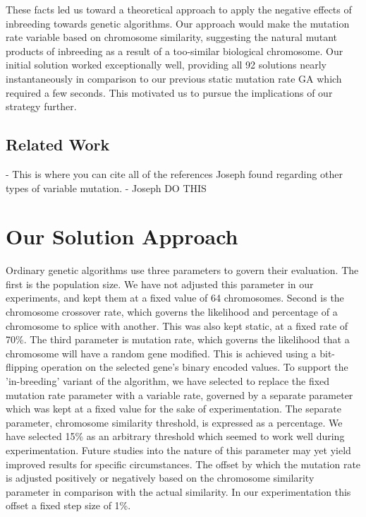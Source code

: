 \documentclass{sig-alternate}
\begin{document}
These facts led us toward a theoretical approach to apply the negative effects of inbreeding towards genetic algorithms. Our approach would make the mutation rate variable based on chromosome similarity, suggesting the natural mutant products of inbreeding as a result of a too-similar biological chromosome. Our initial solution worked exceptionally well, providing all 92 solutions nearly instantaneously in comparison to our previous static mutation rate GA which required a few seconds. This motivated us to pursue the implications of our strategy further.

\subsection{Related Work}

- This is where you can cite all of the references Joseph found regarding other types of variable mutation.
- Joseph DO THIS




% 
%
\section{Our Solution Approach}
Ordinary genetic algorithms use three parameters to govern their evaluation. The first is the population size. We have not adjusted this parameter in our experiments, and kept them at a fixed value of 64 chromosomes. Second is the chromosome crossover rate, which governs the likelihood and percentage of a chromosome to splice with another. This was also kept static, at a fixed rate of 70\%. The third parameter is mutation rate, which governs the likelihood that a chromosome will have a random gene modified. This is achieved using a bit-flipping operation on the selected gene's binary encoded values. To support the 'in-breeding' variant of the algorithm, we have selected to replace the fixed mutation rate parameter with a variable rate, governed by a separate parameter which was kept at a fixed value for the sake of experimentation. The separate parameter, chromosome similarity threshold, is expressed as a percentage. We have selected 15\% as an arbitrary threshold which seemed to work well during experimentation. Future studies into the nature of this parameter may yet yield improved results for specific circumstances. The offset by which the mutation rate is adjusted positively or negatively based on the chromosome similarity parameter in comparison with the actual similarity. In our experimentation this offset a fixed step size of 1\%.
\end{document}
